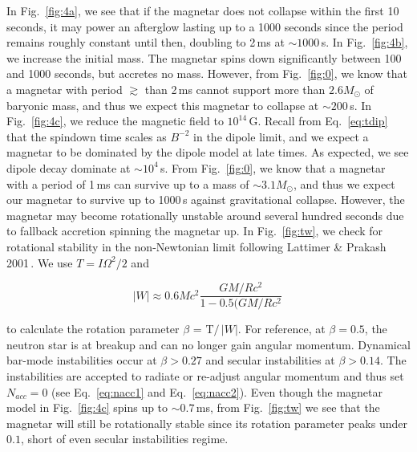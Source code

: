 \documentclass{article}
\begin{document}
In Fig.~\ref{fig:4a}, we see that if the magnetar does not collapse within the first 10 seconds, it may power an afterglow lasting up to a 1000 seconds since the period remains roughly constant until then, doubling to 2\,ms at $\sim 1000$\,s. In Fig.~\ref{fig:4b}, we increase the initial mass. The magnetar spins down significantly between 100 and 1000 seconds, but accretes no mass. However, from Fig.~\ref{fig:0}, we know that a magnetar with period $\gtrsim$ than 2\,ms cannot support more than $2.6 M_{\odot}$ of baryonic mass, and thus we expect this magnetar to collapse at $\sim 200$\,s. In Fig.~\ref{fig:4c}, we reduce the magnetic field to $10^{14}$\,G. Recall from Eq.~\ref{eq:tdip} that the spindown time scales as $B^{-2}$ in the dipole limit, and we expect a magnetar to be dominated by the dipole model at late times. As expected, we see dipole decay dominate at $\sim 10^4$\,s. From Fig.~\ref{fig:0}, we know that a magnetar with a period of 1\,ms can survive up to a mass of $\sim 3.1 M_{\odot}$, and thus we expect our magnetar to survive up to 1000\,s against gravitational collapse. However, the magnetar may become rotationally unstable around several hundred seconds due to fallback accretion spinning the magnetar up. In Fig.~\ref{fig:tw}, we check for rotational stability in the non-Newtonian limit following Lattimer \& Prakash 2001\,\cite{Lattimer:2001ap}. We use $T= I\Omega^2/2$ and 

\begin{equation}
  |W| \approx 0.6 M c^2 \frac{GM/Rc^2}{1-0.5(GM/Rc^2}\,
\end{equation}

to calculate the rotation parameter $\beta$ = T$/$\,$|W|$. For reference, at $\beta=0.5$, the neutron star is at breakup and can no longer gain angular momentum. Dynamical bar-mode instabilities occur at $\beta > 0.27$ and secular instabilities at $\beta > 0.14$. The instabilities are accepted to radiate or re-adjust angular momentum and thus set $N_{acc} = 0$ (see Eq.~\ref{eq:nacc1} and Eq.~\ref{eq:nacc2}). Even though the magnetar model in Fig.~\ref{fig:4c} spins up to $\sim 0.7$\,ms, from Fig.~\ref{fig:tw} we see that the magnetar will still be rotationally stable since its rotation parameter peaks under $0.1$, short of even secular instabilities regime.
\end{document}
